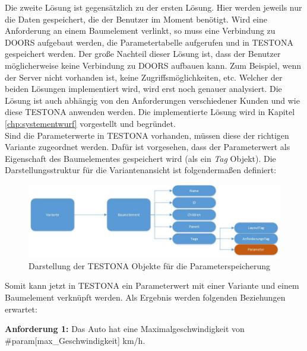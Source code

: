 Die zweite Lösung ist gegensätzlich zu der ersten Lösung. Hier werden jeweils nur die Daten gespeichert, die der Benutzer im Moment benötigt. Wird eine Anforderung an einem Baumelement verlinkt, so muss eine Verbindung zu DOORS aufgebaut werden, die Parametertabelle aufgerufen und in TESTONA gespeichert werden. Der große Nachteil dieser Lösung ist, dass der Benutzer möglicherweise keine Verbindung zu DOORS aufbauen kann. Zum Beispiel, wenn der Server nicht vorhanden ist, keine Zugriffsmöglichkeiten, etc. Welcher der beiden Lösungen implementiert wird, wird erst noch genauer analysiert. Die Lösung ist auch abhängig von den Anforderungen verschiedener Kunden und wie diese TESTONA anwenden werden. Die implementierte Lösung wird in Kapitel \ref{chp:systementwurf} vorgestellt und begründet.\\


Sind die Parameterwerte in TESTONA vorhanden, müssen diese der richtigen Variante zugeordnet werden. Dafür ist vorgesehen, dass der Parameterwert als Eigenschaft des Baumelementes gespeichert wird (als ein \textit{Tag} Objekt). Die Darstellungsstruktur für die Variantenansicht ist folgendermaßen definiert:\\

\begin{figure}[h!]
  \begin{center}
    \includegraphics[scale=0.65]{4_1_UML_Var_TreeItem_Properties.jpg}
  		  \caption{Darstellung der TESTONA Objekte für die Parameterspeicherung}
     \label{ttn.objectGraph}
  \end{center}
\end{figure}

\hspace{2cm}

Somit kann jetzt in TESTONA ein Parameterwert mit einer Variante und einem Baumelement verknüpft werden. Als Ergebnis werden folgenden Beziehungen erwartet:

\begin{center}
\textbf{Anforderung 1: }Das Auto hat eine Maximalgeschwindigkeit von \#param[max\_Geschwindigkeit] km/h.
\end{center}

